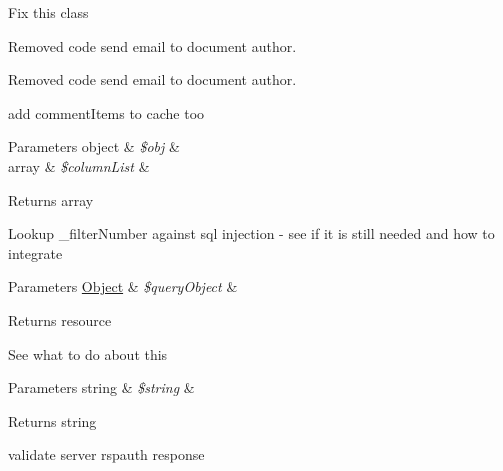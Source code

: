 
\begin{DoxyRefList}
\item[\label{todo__todo000003}%
\hypertarget{todo__todo000003}{}%
Namespace \hyperlink{namespaceclasses}{classes} ]Fix this class  
\item[\label{todo__todo000005}%
\hypertarget{todo__todo000005}{}%
Member \hyperlink{classcommentAdminController_a70bde7bc9124b72df7bdf6bf09633148}{comment\+Admin\+Controller\+:\+:proc\+Comment\+Admin\+Change\+Status} ()]Removed code send email to document author.  
\item[\label{todo__todo000006}%
\hypertarget{todo__todo000006}{}%
Member \hyperlink{classcommentController_a36736562b092a021301ec11a61310e68}{comment\+Controller\+:\+:send\+Email\+To\+Admin\+After\+Insert\+Comment} (\$obj)]Removed code send email to document author.  
\item[\label{todo__todo000007}%
\hypertarget{todo__todo000007}{}%
Member \hyperlink{classcommentModel_a89492b8f475e42296e1560b8886bdc01}{comment\+Model\+:\+:get\+Newest\+Comment\+List} (\$obj, \$column\+List=array())]add comment\+Items to cache too 
\begin{DoxyParams}[1]{Parameters}
object & {\em \$obj} & \\
\hline
array & {\em \$column\+List} & \\
\hline
\end{DoxyParams}
\begin{DoxyReturn}{Returns}
array  
\end{DoxyReturn}

\item[\label{todo__todo000002}%
\hypertarget{todo__todo000002}{}%
Member \hyperlink{classDBMssql_aa3f04ce5bee8d9e11db7de7293055fef}{D\+B\+Mssql\+:\+:\+\_\+execute\+Insert\+Act} (\$query\+Object)]Lookup \+\_\+filter\+Number against sql injection -\/ see if it is still needed and how to integrate 
\begin{DoxyParams}[1]{Parameters}
\hyperlink{classObject}{Object} & {\em \$query\+Object} & \\
\hline
\end{DoxyParams}
\begin{DoxyReturn}{Returns}
resource  
\end{DoxyReturn}

\item[\label{todo__todo000001}%
\hypertarget{todo__todo000001}{}%
Member \hyperlink{classDBMssql_ac380f1918abd17fd5cba28accfaec9fc}{D\+B\+Mssql\+:\+:add\+Quotes} (\$string)]See what to do about this 
\begin{DoxyParams}[1]{Parameters}
string & {\em \$string} & \\
\hline
\end{DoxyParams}
\begin{DoxyReturn}{Returns}
string  
\end{DoxyReturn}

\item[\label{todo__todo000004}%
\hypertarget{todo__todo000004}{}%
Member \hyperlink{classHTTP__Request2__Adapter__Socket_abe6b620d64a56d799cd9367aedf3c0e6}{H\+T\+T\+P\+\_\+\+Request2\+\_\+\+Adapter\+\_\+\+Socket\+:\+:update\+Challenge} (\&\$challenge, \$header\+Value)]validate server rspauth response 
\end{DoxyRefList}